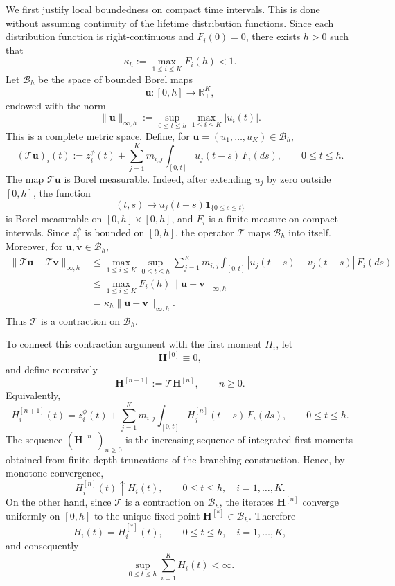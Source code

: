 \documentclass[reqno,final,11pt]{amsart}
\newcommand{\1}{\mathbbm{1}}
\theoremstyle{plain}
\theoremstyle{definition}
\theoremstyle{remark}
\begin{document}
We first justify local boundedness on compact time intervals. This is done
without assuming continuity of the lifetime distribution functions. Since
each distribution function is right-continuous and \(F_i(0)=0\), there exists
\(h>0\) such that
\[
\kappa_h:=\max_{1\le i\le K}F_i(h)<1.
\]
Let \(\mathcal B_h\) be the space of bounded Borel maps
\[
\mathbf u:[0,h]\to \mathbb R_+^K,
\]
endowed with the norm
\[
\|\mathbf u\|_{\infty,h}
:=
\sup_{0\le t\le h}\max_{1\le i\le K}|u_i(t)|.
\]
This is a complete metric space. Define, for
\(\mathbf u=(u_1,\ldots,u_K)\in\mathcal B_h\),
\[
(\mathcal T\mathbf u)_i(t)
:=
z_i^\phi(t)
+
\sum_{j=1}^K m_{i,j}
\int_{[0,t]}u_j(t-s)\,F_i(ds),
\qquad 0\le t\le h.
\]
The map \(\mathcal T\mathbf u\) is Borel measurable. Indeed, after extending
\(u_j\) by zero outside \([0,h]\), the function
\[
(t,s)\mapsto u_j(t-s)\mathbf 1_{\{0\le s\le t\}}
\]
is Borel measurable on \([0,h]\times[0,h]\), and \(F_i\) is a finite measure
on compact intervals. Since \(z_i^\phi\) is bounded on \([0,h]\), the operator
\(\mathcal T\) maps \(\mathcal B_h\) into itself. Moreover, for
\(\mathbf u,\mathbf v\in\mathcal B_h\),
\[
\begin{aligned}
\| \mathcal T\mathbf u-\mathcal T\mathbf v\|_{\infty,h}
&\le
\max_{1\le i\le K}
\sup_{0\le t\le h}
\sum_{j=1}^K m_{i,j}
\int_{[0,t]} |u_j(t-s)-v_j(t-s)|\,F_i(ds) \\
&\le
\max_{1\le i\le K}F_i(h)
\|\mathbf u-\mathbf v\|_{\infty,h} \\
&=
\kappa_h
\|\mathbf u-\mathbf v\|_{\infty,h}.
\end{aligned}
\]
Thus \(\mathcal T\) is a contraction on \(\mathcal B_h\).

To connect this contraction argument with the first moment \(H_i\), let
\[
\mathbf H^{[0]}\equiv 0,
\]
and define recursively
\[
\mathbf H^{[n+1]}:=\mathcal T\mathbf H^{[n]},
\qquad n\ge0.
\]
Equivalently,
\[
H_i^{[n+1]}(t)
=
z_i^\phi(t)
+
\sum_{j=1}^K m_{i,j}
\int_{[0,t]}H_j^{[n]}(t-s)\,F_i(ds),
\qquad 0\le t\le h.
\]
The sequence \((\mathbf H^{[n]})_{n\ge0}\) is the increasing sequence of
integrated first moments obtained from finite-depth truncations of the
branching construction. Hence, by monotone convergence,
\[
H_i^{[n]}(t)\uparrow H_i(t),
\qquad
0\le t\le h,\quad i=1,\ldots,K.
\]
On the other hand, since \(\mathcal T\) is a contraction on \(\mathcal B_h\),
 the iterates \(\mathbf H^{[n]}\) converge uniformly on \([0,h]\) to the
 unique fixed point \(\mathbf H^{[*]}\in\mathcal B_h\). Therefore
\[
H_i(t)=H_i^{[*]}(t),
\qquad 0\le t\le h,\quad i=1,\ldots,K,
\]
and consequently
\[
\sup_{0\le t\le h}\sum_{i=1}^K H_i(t)<\infty.
\]
\end{document}
